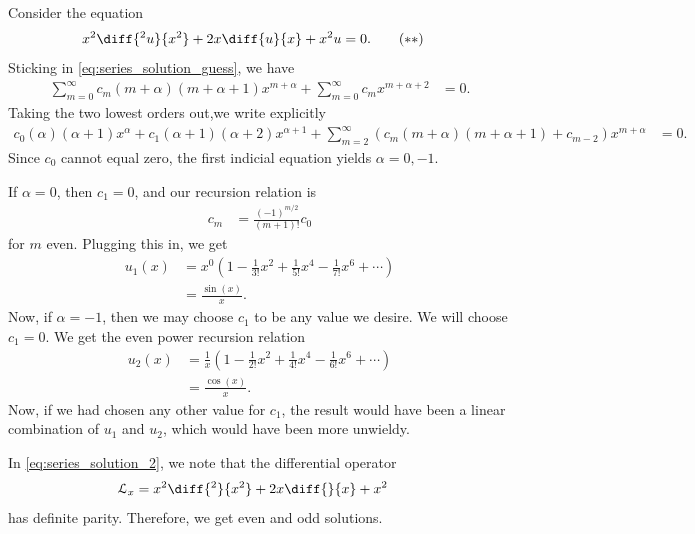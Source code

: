 \documentclass[10pt]{mypackage}
\begin{document}
  \begin{example}
    Consider the equation
    \begin{align*}
      x^2\diff{^2u}{x^2} + 2x\diff{u}{x} + x^2 u &= 0.\label{eq:series_solution_2}\tag{$\ast\ast$}
    \end{align*}
    Sticking in \eqref{eq:series_solution_guess}, we have
    \begin{align*}
      \sum_{m=0}^{\infty}c_m\left( m + \alpha \right)\left( m + \alpha + 1 \right)x^{m + \alpha} + \sum_{m=0}^{\infty}c_mx^{m + \alpha + 2} &= 0.
    \end{align*}
    Taking the two lowest orders out,we write explicitly
    \begin{align*}
      c_0\left( \alpha \right)\left( \alpha + 1 \right)x^{\alpha} + c_1\left( \alpha + 1 \right)\left( \alpha + 2 \right) x^{\alpha + 1} + \sum_{m=2}^{\infty}\left( c_m\left( m + \alpha \right)\left( m + \alpha + 1 \right) + c_{m-2} \right)x^{m + \alpha} &= 0.
    \end{align*}
    Since $c_0$ cannot equal zero, the first indicial equation yields $\alpha = 0,-1$.\newline

    If $\alpha = 0$, then $c_1 = 0$, and our recursion relation is
    \begin{align*}
      c_m &= \frac{\left( -1 \right)^{m/2}}{\left( m+1 \right)!} c_0
    \end{align*}
    for $m$ even. Plugging this in, we get
    \begin{align*}
      u_1(x) &= x^{0}\left( 1  - \frac{1}{3!}x^2 + \frac{1}{5!}x^{4} - \frac{1}{7!}x^{6} + \cdots \right)\\
             &= \frac{\sin(x)}{x}.
    \end{align*}
    Now, if $\alpha = -1$, then we may choose $c_1$ to be any value we desire. We will choose $c_1 = 0$. We get the even power recursion relation
    \begin{align*}
      u_2(x) &= \frac{1}{x}\left( 1 - \frac{1}{2!}x^2 + \frac{1}{4!}x^{4} -\frac{1}{6!}x^{6} + \cdots \right)\\
             &= \frac{\cos(x)}{x}.
    \end{align*}
    Now, if we had chosen any other value for $c_1$, the result would have been a linear combination of $u_1$ and $u_2$, which would have been more unwieldy.
  \end{example}
  In \eqref{eq:series_solution_2}, we note that the differential operator
  \begin{align*}
    \mathcal{L}_x &= x^2\diff{^2}{x^2} + 2x\diff{}{x} + x^2
  \end{align*}
  has definite parity. Therefore, we get even and odd solutions.\newline
\end{document}
